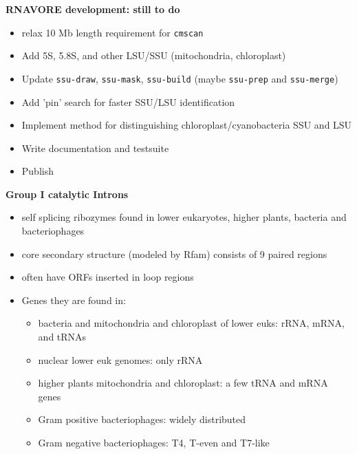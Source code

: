 \documentclass[landscape]{slides}
\begin{document}
\begin{slide}
\begin{center}
\small
\textbf{RNAVORE development: still to do}
\end{center}

\small
\begin{itemize}
\item relax 10 Mb length requirement for \texttt{cmscan}
\item Add 5S, 5.8S, and other LSU/SSU (mitochondria, chloroplast)
\item Update \texttt{ssu-draw}, \texttt{ssu-mask}, \texttt{ssu-build}
  (maybe \texttt{ssu-prep} and \texttt{ssu-merge})
\item Add 'pin' search for faster SSU/LSU identification
\item Implement method for distinguishing chloroplast/cyanobacteria
  SSU and LSU
\item Write documentation and testsuite
\item Publish
\end{itemize}

\vfill
\end{slide}
\begin{slide}
\begin{center}
\small
\textbf{Group I catalytic Introns}
\end{center}
%
\small
\begin{itemize}
\item self splicing ribozymes found in lower eukaryotes, higher
  plants, bacteria and bacteriophages
\item core secondary structure (modeled by Rfam) consists of 9 paired
  regions
\item often have ORFs inserted in loop regions
\item Genes they are found in:
\begin {itemize}
\item bacteria and mitochondria and chloroplast of lower euks: rRNA, mRNA, and tRNAs
\item nuclear lower euk genomes: only rRNA
\item higher plants mitochondria and chloroplast: a few tRNA and mRNA genes
\item Gram positive bacteriophages: widely distributed
\item Gram negative bacteriophages: T4, T-even and T7-like
\end{itemize}
\end{itemize}

\vfill
\end{slide}
\end{document}
